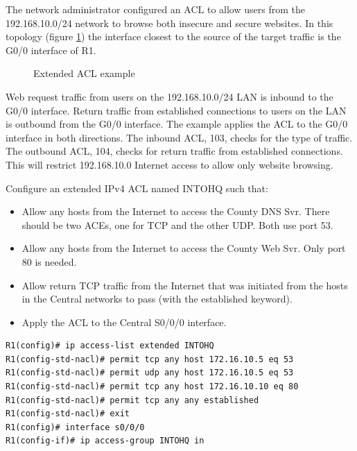 \begin{example}
The network administrator configured an ACL to allow users from the 192.168.10.0/24 network to browse both insecure and secure websites. In this topology (figure \ref{example4}) the interface closest to the source of the target traffic is the G0/0 interface of R1.
\begin{figure}[hbtp]
\caption{Extended ACL example}\label{example4}
\centering
{}
\end{figure}
Web request traffic from users on the 192.168.10.0/24 LAN is inbound to the G0/0 interface. Return traffic from established connections to users on the LAN is outbound from the G0/0 interface. The example applies the ACL to the G0/0 interface in both directions. The inbound ACL, 103, checks for the type of traffic. The outbound ACL, 104, checks for return traffic from established connections. This will restrict 192.168.10.0 Internet access to allow only website browsing.
\end{example}

\begin{example}
Configure an extended IPv4 ACL named INTOHQ such that: 
\begin{itemize}
\item Allow any hosts from the Internet to access the County DNS Svr. There should be two ACEs, one for TCP and the other UDP. Both use port 53.
\item Allow any hosts from the Internet to access the County Web Svr. Only port 80 is needed.
\item Allow return TCP traffic from the Internet that was initiated from the hosts in the Central networks to pass (with the established keyword).
\item Apply the ACL to the Central S0/0/0 interface.
\end{itemize}
\begin{verbatim}
R1(config)# ip access-list extended INTOHQ
R1(config-std-nacl)# permit tcp any host 172.16.10.5 eq 53
R1(config-std-nacl)# permit udp any host 172.16.10.5 eq 53
R1(config-std-nacl)# permit tcp any host 172.16.10.10 eq 80
R1(config-std-nacl)# permit tcp any any established
R1(config-std-nacl)# exit
R1(config)# interface s0/0/0
R1(config-if)# ip access-group INTOHQ in
\end{verbatim}
\end{example}

